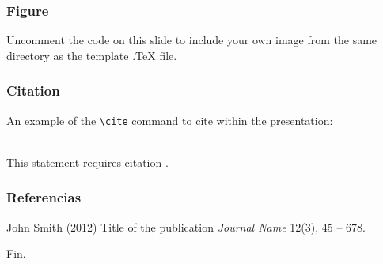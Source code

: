 \documentclass{beamer}
\begin{document}

\begin{frame}
\frametitle{Figure}
Uncomment the code on this slide to include your own image from the same directory as the template .TeX file.
\end{frame}


\begin{frame}[fragile] %
\frametitle{Citation}
An example of the \verb|\cite| command to cite within the presentation:\\~

This statement requires citation \cite{p1}.
\end{frame}


\begin{frame}
\frametitle{Referencias}
\footnotesize{
  \begin{thebibliography}{99} %
     John Smith (2012)
      \newblock Title of the publication
      \newblock \emph{Journal Name} 12(3), 45 -- 678.
  \end{thebibliography}
}
\end{frame}


\begin{frame}
\Huge{\centerline{Fin.}}
\end{frame}

\end{document}
